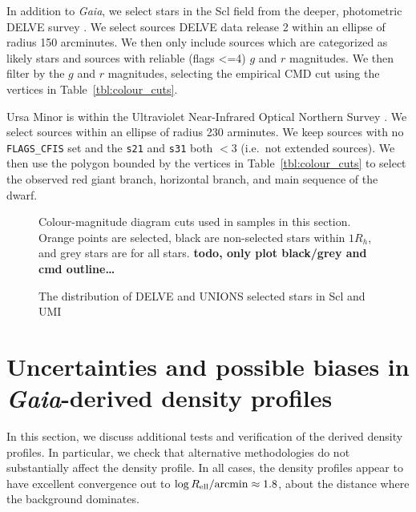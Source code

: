 In addition to \emph{Gaia}, we select stars in the Scl field from the
deeper, photometric DELVE survey \citep{drlica-wagner+2022}. We select
sources DELVE data release 2 within an ellipse of radius 150 arcminutes.
We then only include sources which are categorized as likely stars and
sources with reliable (flags \textless=4) \(g\) and \(r\) magnitudes. We
then filter by the \(g\) and \(r\) magnitudes, selecting the empirical
CMD cut using the vertices in Table~\ref{tbl:colour_cuts}.

Ursa Minor is within the Ultraviolet Near-Infrared Optical Northern
Survey \citep[UNIONS][]{gwyn+2025}. We select sources within an ellipse
of radius 230 arminutes. We keep sources with no \texttt{FLAGS\_CFIS}
set and the \texttt{s21} and \texttt{s31} both \(<3\) (i.e.~not extended
sources). We then use the polygon bounded by the vertices in
Table~\ref{tbl:colour_cuts} to select the observed red giant branch,
horizontal branch, and main sequence of the dwarf.

\begin{figure}
\centering
{}
\caption[CMD cuts]{Colour-magnitude diagram cuts used in samples in this
section. Orange points are selected, black are non-selected stars within
\(1R_h\), and grey stars are for all stars. \textbf{todo, only plot
black/grey and cmd outline\ldots{}}}
\end{figure}

\begin{figure}
\centering
{}
\caption[DELVE and UNIONS spatial distribution of stars]{The
distribution of DELVE and UNIONS selected stars in Scl and UMI}
\end{figure}

\section{\texorpdfstring{Uncertainties and possible biases in
\emph{Gaia}-derived density
profiles}{Uncertainties and possible biases in Gaia-derived density profiles}}\label{sec:density_extra}

In this section, we discuss additional tests and verification of the
derived density profiles. In particular, we check that alternative
methodologies do not substantially affect the density profile. In all
cases, the density profiles appear to have excellent convergence out to
\(\log R_{\rm ell} / {\rm arcmin} \approx 1.8\), about the distance
where the background dominates.

